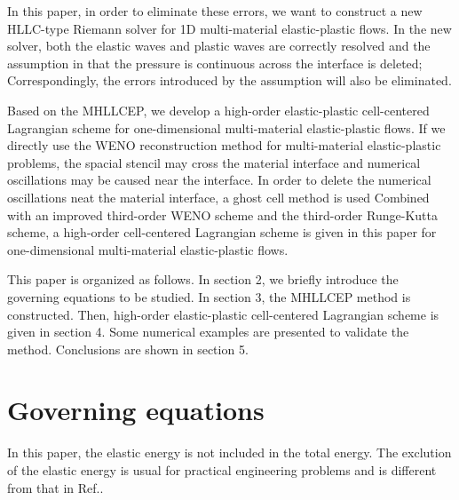 \documentclass[review]{elsarticle}
\begin{document}
In this paper, in order to eliminate these errors,
 we want to construct a new HLLC-type Riemann solver for 1D multi-material elastic-plastic flows. In the new solver, both the elastic waves and plastic waves are correctly resolved and the assumption in \cite{cheng2016harten} that the pressure is continuous across the interface is deleted; Correspondingly, the errors introduced by the assumption will also be eliminated.

Based on the MHLLCEP, we develop a high-order elastic-plastic cell-centered Lagrangian scheme for one-dimensional multi-material elastic-plastic flows. If we directly use the WENO reconstruction method \cite{liu2018novel} for multi-material elastic-plastic problems,
the spacial stencil may cross the material interface
 and numerical oscillations may be caused near the interface. In order to delete the numerical oscillations neat the material interface, a ghost cell method is used
   Combined with an improved third-order WENO scheme\cite{liu2018novel} and the third-order Runge-Kutta scheme, a high-order cell-centered Lagrangian scheme is given in this paper for one-dimensional multi-material elastic-plastic flows.

This paper is organized as follows. In section 2, we briefly introduce the governing equations to be studied. In section 3, the MHLLCEP method is constructed.  Then, high-order elastic-plastic cell-centered Lagrangian scheme is given in section 4. Some numerical examples are presented to validate the method.  Conclusions are shown in section 5.
\section{Governing equations}
In this paper, the elastic energy is not included in the total energy. The exclution of the elastic energy is usual for practical engineering problems \cite{maire2013nominally} and is different from that in Ref.\cite{gavrilyuk2008modelling}.

\end{document}
